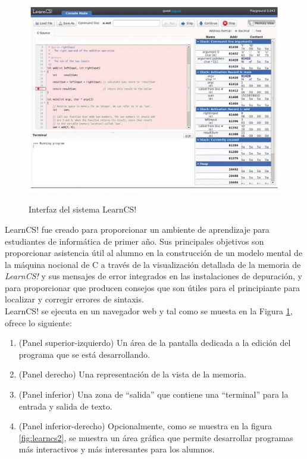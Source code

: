 \begin{figure}[!h]
  \centering
  \includegraphics[scale=0.4]{figuras/learncs.png}\\
  \caption[LearnCS]{Interfaz del sistema LearnCS! \protect\cite{lipman_learncs_2014}}
  \label{fig:learncs}
\end{figure}

LearnCS! fue creado para proporcionar un ambiente de aprendizaje para estudiantes de informática de primer año. Sus principales objetivos son proporcionar asistencia útil al alumno en la construcción de un modelo mental de la máquina nocional de C a través de la visualización detallada de la memoria de \emph{LearnCS!} y sus mensajes de error integrados en las instalaciones de depuración, y para proporcionar que producen consejos que son útiles para el principiante para localizar y corregir errores de sintaxis\cite{lipman_learncs_2014}.\\

LearnCS! se ejecuta en un navegador web y tal como se muesta en la Figura \ref{fig:learncs}, ofrece lo siguiente:

\begin{enumerate}
  \item (Panel superior-izquierdo) Un área de la pantalla dedicada a la edición del programa que se está desarrollando.
  \item (Panel derecho) Una representación de la vista de la memoria.
  \item (Panel inferior) Una zona de ``salida'' que contiene una ``terminal'' para la entrada y salida de texto.
  \item (Panel inferior-derecho) Opcionalmente, como se muestra en la figura \ref{fig:learncs2}, se muestra un área gráfica que permite desarrollar programas más interactivos y más interesantes para los alumnos.
\end{enumerate}

